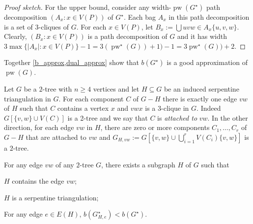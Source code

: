 \documentclass[kpfonts]{patmorin}
\DeclareMathOperator{\pw}{pw}
\begin{document}
\begin{proof}[Proof sketch]
    For the upper bound, consider any width-$\pw(G^\star)$ path decomposition $(A_x:x\in V(P))$ of $G^\star$. Each bag $A_x$ in this path decomposition is a set of 3-cliques of $G$.  For each $x\in V(P)$, let $B_x:=\bigcup{uvw\in A_x}\{u,v,w\}$.  Clearly, $(B_x:x\in V(P))$ is a path decomposition of $G$ and it has width $3\max\{|A_x|:x\in V(P)\}-1=3(\pw^\star(G))+1)-1=3\pw^\star(G)) + 2$.

\end{proof}

Together \cref{b_approx,dual_approx} show that $b(G^\star)$ is a good approximation of $\pw(G)$.

Let $G$ be a $2$-tree with $n\ge 4$ vertices and let $H\subseteq G$ be an induced serpentine triangulation in $G$.  For each component $C$ of $G-H$ there is exactly one edge $vw$ of $H$ such that $C$ contains a vertex $x$ and $vwx$ is a $3$-clique in $G$.  Indeed $G[\{v,w\}\cup V(C)]$ is a 2-tree and we say that $C$ is \emph{attached to} $vw$.  In the other direction, for each edge $vw$ in $H$, there are zero or more components $C_1,\ldots,C_r$ of $G-H$ that are attached to $vw$ and $G_{H,vw}:=G[\{v,w\}\cup \bigcup_{i=1}^r V(C_i)\{v,w\}]$ is a $2$-tree.

\begin{lem}\label{serpentine_separator}
    For any edge $vw$ of any $2$-tree $G$, there exists a subgraph $H$ of $G$ such that
    \begin{compactenum}[(i)]
        \item $H$ contains the edge $vw$;
        \item $H$ is a serpentine triangulation;
        \item For any edge $e\in E(H)$, $b(G^\star_{H,e})<b(G^\star)$.
    \end{compactenum}
\end{lem}
\end{document}
